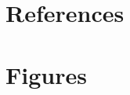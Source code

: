 \documentclass[11pt]{elife}\usepackage[]{graphicx}\usepackage[]{color}
\begin{document}
\section{References}

\nocite{*}



\section{Figures}


\end{document}
